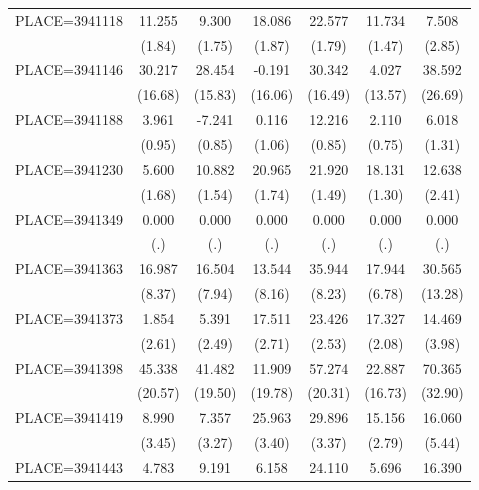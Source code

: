 {\begin{tabular}{l*{6}{c}}
PLACE=3941118       &      11.255&       9.300&      18.086&      22.577&      11.734&       7.508\\
                    &      (1.84)&      (1.75)&      (1.87)&      (1.79)&      (1.47)&      (2.85)\\
PLACE=3941146       &      30.217&      28.454&      -0.191&      30.342&       4.027&      38.592\\
                    &     (16.68)&     (15.83)&     (16.06)&     (16.49)&     (13.57)&     (26.69)\\
PLACE=3941188       &       3.961&      -7.241&       0.116&      12.216&       2.110&       6.018\\
                    &      (0.95)&      (0.85)&      (1.06)&      (0.85)&      (0.75)&      (1.31)\\
PLACE=3941230       &       5.600&      10.882&      20.965&      21.920&      18.131&      12.638\\
                    &      (1.68)&      (1.54)&      (1.74)&      (1.49)&      (1.30)&      (2.41)\\
PLACE=3941349       &       0.000&       0.000&       0.000&       0.000&       0.000&       0.000\\
                    &         (.)&         (.)&         (.)&         (.)&         (.)&         (.)\\
PLACE=3941363       &      16.987&      16.504&      13.544&      35.944&      17.944&      30.565\\
                    &      (8.37)&      (7.94)&      (8.16)&      (8.23)&      (6.78)&     (13.28)\\
PLACE=3941373       &       1.854&       5.391&      17.511&      23.426&      17.327&      14.469\\
                    &      (2.61)&      (2.49)&      (2.71)&      (2.53)&      (2.08)&      (3.98)\\
PLACE=3941398       &      45.338&      41.482&      11.909&      57.274&      22.887&      70.365\\
                    &     (20.57)&     (19.50)&     (19.78)&     (20.31)&     (16.73)&     (32.90)\\
PLACE=3941419       &       8.990&       7.357&      25.963&      29.896&      15.156&      16.060\\
                    &      (3.45)&      (3.27)&      (3.40)&      (3.37)&      (2.79)&      (5.44)\\
PLACE=3941443       &       4.783&       9.191&       6.158&      24.110&       5.696&      16.390\\

\end{tabular}}
